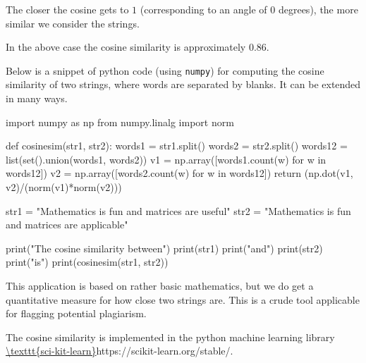 \documentclass{article}
\begin{document}
\begin{example}
The closer the cosine gets to $1$ (corresponding to an angle of $0$
degrees), the more similar we consider the strings.

In the above case the cosine similarity is approximately $0.86$.

Below is a snippet of python code (using \texttt{numpy}) for computing the cosine similarity of two strings, where
words are separated by blanks. It can be extended in many ways.




\begin{sage}
import numpy as np
from numpy.linalg import norm

def cosinesim(str1, str2):
  words1 = str1.split()
  words2 = str2.split()
  words12 = list(set().union(words1, words2))
  v1 = np.array([words1.count(w) for w in words12])
  v2 = np.array([words2.count(w) for w in words12])
  return (np.dot(v1, v2)/(norm(v1)*norm(v2)))

str1 = "Mathematics is fun and matrices are useful"
str2 = "Mathematics is fun and matrices are applicable"

print("The cosine similarity between")
print(str1)
print("and")
print(str2)
print("is")
print(cosinesim(str1, str2))
\end{sage}


This application is based on rather basic mathematics, but we do get a quantitative measure for
how close two strings are. This is a crude tool applicable for flagging potential plagiarism.

The cosine similarity is implemented in the python machine
learning library \url{\texttt{sci-kit-learn}}{https://scikit-learn.org/stable/}.

\end{example}
\end{document}
